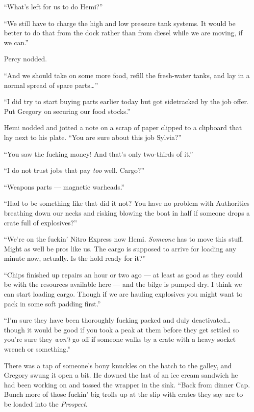 \documentclass[
]{scrbook}
\begin{document}
``What's left for us to do Hemi?''

``We still have to charge the high and low pressure tank systems. It
would be better to do that from the dock rather than from diesel while
we are moving, if we can.''

Percy nodded.

``And we should take on some more food, refill the fresh-water tanks,
and lay in a normal spread of spare parts\ldots{}''

``I did try to start buying parts earlier today but got sidetracked by
the job offer. Put Gregory on securing our food stocks.''

Hemi nodded and jotted a note on a scrap of paper clipped to a clipboard
that lay next to his plate. ``You are sure about this job Sylvia?''

``You saw the fucking money! And that's only two-thirds of it.''

``I do not trust jobs that pay \emph{too} well. Cargo?''

``Weapons parts --- magnetic warheads.''

``Had to be something like that did it not? You have no problem with
Authorities breathing down our necks and risking blowing the boat in
half if someone drops a crate full of explosives?''

``We're on the fuckin' Nitro Express now Hemi. \emph{Someone} has to
move this stuff. Might as well be pros like us. The cargo is supposed to
arrive for loading any minute now, actually. Is the hold ready for it?''

``Chips finished up repairs an hour or two ago --- at least as good as
they could be with the resources available here --- and the bilge is
pumped dry. I think we can start loading cargo. Though if we are hauling
explosives you might want to pack in some soft padding first.''

``I'm sure they have been thoroughly fucking packed and duly
deactivated\ldots{} though it would be good if you took a peak at them
before they get settled so you're sure they \emph{won't} go off if
someone walks by a crate with a heavy socket wrench or something.''

There was a tap of someone's bony knuckles on the hatch to the galley,
and Gregory swung it open a bit. He downed the last of an ice cream
sandwich he had been working on and tossed the wrapper in the sink.
``Back from dinner Cap. Bunch more of those fuckin' big trolls up at the
slip with crates they say are to be loaded into the \emph{Prospect}.
\end{document}
